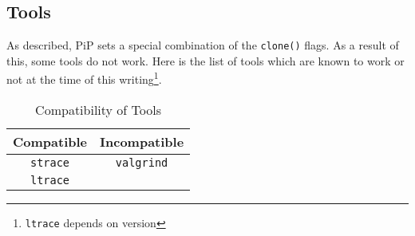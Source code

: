 \subsection{Tools}

As described, PiP sets a special combination of the {\tt clone()}
flags. As a result of this, some tools do not work. Here is the list
of tools which are known to work or not at the time of this
writing\footnote{{\tt ltrace} depends on version}. 

\begin{table}[ht]
  \centering
  \caption{Compatibility of Tools}
  \vspace{3mm}
  \begin{tabular}{c|c}
    \hline
    Compatible & Incompatible \\
    \hline
    {\tt strace} & {\tt valgrind} \\
    {\tt ltrace} \\
    \hline
  \end{tabular}
  \end{table}
